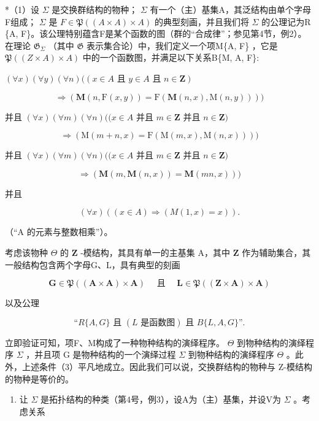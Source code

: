 *（1）设 \(\Sigma\) 是交换群结构的物种； \(\Sigma\) 有一个（主）基集A，其泛结构由单个字母F组成； \(\Sigma\) 是 \(F \in \mathfrak{P}((A \times A) \times A)\) 的典型刻画，并且我们将 \(\Sigma\) 的公理记为R \{A, F\}。该公理特别蕴含F是某个函数的图（群的“合成律”；参见第4节，例2）。在理论 \(\mathfrak{G}_{\Sigma}\) （其中 \(\mathfrak{G}\) 表示集合论）中，我们定义一个项M\{A, F\} ，它是 \(\mathfrak{P}((Z \times A) \times A)\) 中的一个函数图，并满足以下关系B\{M, A, F\}:

\((\forall x)(\forall y)(\forall n)((x \in A \text{ 且 } y \in A \text{ 且 } n \in \mathbf{Z})\)

\[
\Longrightarrow (\mathbf {M} (n, \mathrm{F} (x, y)) = \mathrm{F} (\mathbf {M} (n, x), \mathrm{M} (n, y))))
\]

并且 \((\forall x)(\forall m)(\forall n)((x\in A\) 并且 \(m\in \mathbf{Z}\) 并且 \(n\in \mathbf{Z})\)

\[
\Rightarrow (\mathrm{M} (m + n, x) = \mathrm{F} (\mathrm{M} (m, x), \mathrm{M} (n, x))))
\]

并且 \((\forall x)(\forall m)(\forall n)((x\in A\) 并且 \(m\in \mathbf{Z}\) 并且 \(n\in \mathbf{Z})\)

\[
\Longrightarrow (\mathbf {M} (m, \mathbf {M} (n, x)) = \mathbf {M} (m n, x)))
\]

并且

\[
(\forall x) ((x \in A) \Longrightarrow (M (1, x) = x)).
\]

（“A 的元素与整数相乘”）。

考虑该物种 \(\Theta\) 的 \(\mathbf{Z}\) -模结构，其具有单一的主基集 A，其中 \(\mathbf{Z}\) 作为辅助集合，其一般结构包含两个字母G、L，具有典型的刻画

\[
\mathbf {G} \in \mathfrak {P} ((\mathbf {A} \times \mathbf {A}) \times \mathbf {A}) \quad \text { 且 } \quad \mathbf {L} \in \mathfrak {P} ((\mathbf {Z} \times \mathbf {A}) \times \mathbf {A})
\]

以及公理

\[
\text{``}R\{A,G\}\text{ 且 }(L\text{ 是函数图})\text{ 且 }B\{L,A,G\}\text{''.}
\]

立即验证可知，项F、M构成了一种物种结构的演绎程序。 \(\Theta\) 到物种结构的演绎程序 \(\Sigma\) ，并且项 G 是物种结构的一个演绎过程 \(\Sigma\) 到物种结构的演绎程序 \(\Theta\) 。此外，上述条件（3）平凡地成立。因此我们可以说，交换群结构的物种与 Z-模结构的物种是等价的。

\begin{enumerate}
\def\labelenumi{(\arabic{enumi})}
\setcounter{enumi}{1}
\tightlist
\item
  让 \(\Sigma\) 是拓扑结构的种类（第4号，例3），设A为（主）基集，并设V为 \(\Sigma\) 。考虑关系
\end{enumerate}

